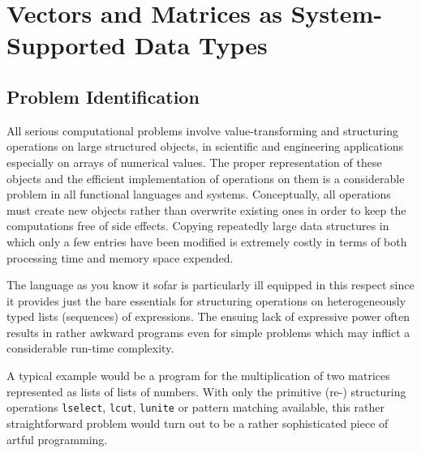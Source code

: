 \section{Vectors and Matrices as System-Supported Data Types}
\subsection{Problem Identification}
All serious computational problems involve {\mys value-transforming} and {\mys structuring operations} on large {\mys structured objects}, in scientific and engineering applications 
especially on {\mys arrays} of {\mys numerical values}. The proper 
representation of these objects and the efficient implementation
of operations on them is a considerable problem in all functional
languages and systems. Conceptually, all operations must create
new objects rather than overwrite existing ones in order to keep
the computations free of side effects. Copying repeatedly
large data structures in which only a few entries have been modified is extremely costly in terms of both processing time and memory 
space expended.

The language \kir as you know it sofar is particularly ill
equipped in this respect since it provides just the bare essentials
for structuring operations on {\mys heterogeneously typed
 lists}
(sequences) of \kir expressions. The ensuing lack of expressive
power often results in rather awkward programs even for 
simple problems which may inflict
a considerable run-time complexity. 

A typical example would be a \kir program for the {\mys multiplication}
of two {\mys matrices} represented as lists of lists of numbers. With only
the primitive (re-) structuring operations {\tt lselect},
{\tt lcut}, {\tt lunite} or pattern matching available, this
rather straightforward problem would turn out to be a rather
sophisticated piece of artful programming. 

